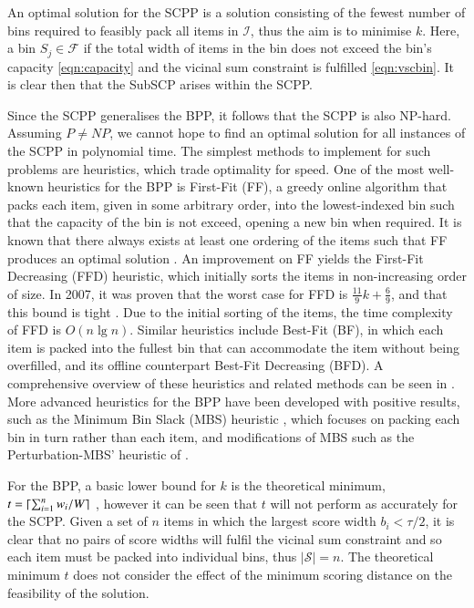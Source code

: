 \documentclass[authoryear]{elsarticle}
\begin{document}
\noindent An optimal solution for the SCPP is a solution consisting of the fewest number of bins required to feasibly pack all items in $\mathcal{I}$, thus the aim is to minimise $k$. Here, a bin $S_j \in \mathcal{F}$ if the total width of items in the bin does not exceed the bin's capacity \eqref{eqn:capacity} and the vicinal sum constraint is fulfilled \eqref{eqn:vscbin}. It is clear then that the SubSCP arises within the SCPP.

Since the SCPP generalises the BPP, it follows that the SCPP is also NP-hard. Assuming $P \neq NP$, we cannot hope to find an optimal solution for all instances of the SCPP in polynomial time. The simplest methods to implement for such problems are heuristics, which trade optimality for speed. One of the most well-known heuristics for the BPP is First-Fit (FF), a greedy online algorithm that packs each item, given in some arbitrary order, into the lowest-indexed bin such that the capacity of the bin is not exceed, opening a new bin when required. It is known that there always exists at least one ordering of the items such that FF produces an optimal solution \citep{lewis2009}. An improvement on FF yields the First-Fit Decreasing (FFD) heuristic, which initially sorts the items in non-increasing order of size. In 2007, it was proven that the worst case for FFD is $\frac{11}{9}k + \frac{6}{9}$, and that this bound is tight \citep{dosa2007}. Due to the initial sorting of the items, the time complexity of FFD is $O(n \lg n)$. Similar heuristics include Best-Fit (BF), in which each item is packed into the fullest bin that can accommodate the item without being overfilled, and its offline counterpart Best-Fit Decreasing (BFD). A comprehensive overview of these heuristics and related methods can be seen in \citet{coffman1984}. More advanced heuristics for the BPP have been developed with positive results, such as the Minimum Bin Slack (MBS) heuristic \citep{gupta1999}, which focuses on packing each bin in turn rather than each item, and modifications of MBS such as the Perturbation-MBS' heuristic of \citet{fleszar2002}. 


For the BPP, a basic lower bound for $k$ is the theoretical minimum, $t = \lceil\sum_{i=1}^{n} w_i / W\rceil$ \citep{martello1990l}, however it can be seen that $t$ will not perform as accurately for the SCPP. Given a set of $n$ items in which the largest score width $b_i < \tau / 2$, it is clear that no pairs of score widths will fulfil the vicinal sum constraint and so each item must be packed into individual bins, thus $|\mathcal{S}| = n$. The theoretical minimum $t$ does not consider the effect of the minimum scoring distance on the feasibility of the solution. 
\end{document}
